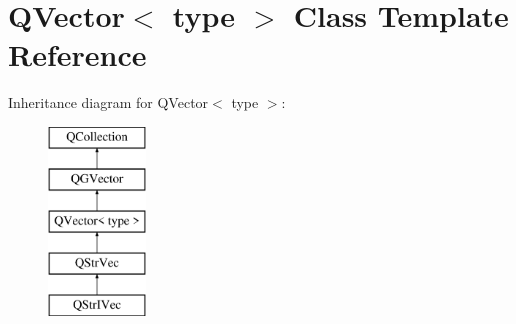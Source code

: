 \hypertarget{class_q_vector}{}\section{Q\+Vector$<$ type $>$ Class Template Reference}
\label{class_q_vector}
Inheritance diagram for Q\+Vector$<$ type $>$\+:\begin{figure}[H]
\begin{center}
\leavevmode
\includegraphics[height=5.000000cm]{class_q_vector}
\end{center}
\end{figure}
